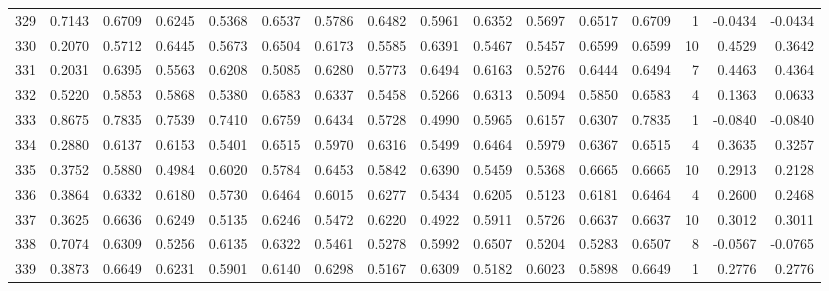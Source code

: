 \begin{tabular}{lrrrrrrrrrrrrrrr}
329 &      0.7143 &  0.6709 &  0.6245 &  0.5368 &  0.6537 &  0.5786 &  0.6482 &  0.5961 &  0.6352 &  0.5697 &   0.6517 &     0.6709 &      1 &                   -0.0434 &                    -0.0434 \\
330 &      0.2070 &  0.5712 &  0.6445 &  0.5673 &  0.6504 &  0.6173 &  0.5585 &  0.6391 &  0.5467 &  0.5457 &   0.6599 &     0.6599 &     10 &                    0.4529 &                     0.3642 \\
331 &      0.2031 &  0.6395 &  0.5563 &  0.6208 &  0.5085 &  0.6280 &  0.5773 &  0.6494 &  0.6163 &  0.5276 &   0.6444 &     0.6494 &      7 &                    0.4463 &                     0.4364 \\
332 &      0.5220 &  0.5853 &  0.5868 &  0.5380 &  0.6583 &  0.6337 &  0.5458 &  0.5266 &  0.6313 &  0.5094 &   0.5850 &     0.6583 &      4 &                    0.1363 &                     0.0633 \\
333 &      0.8675 &  0.7835 &  0.7539 &  0.7410 &  0.6759 &  0.6434 &  0.5728 &  0.4990 &  0.5965 &  0.6157 &   0.6307 &     0.7835 &      1 &                   -0.0840 &                    -0.0840 \\
334 &      0.2880 &  0.6137 &  0.6153 &  0.5401 &  0.6515 &  0.5970 &  0.6316 &  0.5499 &  0.6464 &  0.5979 &   0.6367 &     0.6515 &      4 &                    0.3635 &                     0.3257 \\
335 &      0.3752 &  0.5880 &  0.4984 &  0.6020 &  0.5784 &  0.6453 &  0.5842 &  0.6390 &  0.5459 &  0.5368 &   0.6665 &     0.6665 &     10 &                    0.2913 &                     0.2128 \\
336 &      0.3864 &  0.6332 &  0.6180 &  0.5730 &  0.6464 &  0.6015 &  0.6277 &  0.5434 &  0.6205 &  0.5123 &   0.6181 &     0.6464 &      4 &                    0.2600 &                     0.2468 \\
337 &      0.3625 &  0.6636 &  0.6249 &  0.5135 &  0.6246 &  0.5472 &  0.6220 &  0.4922 &  0.5911 &  0.5726 &   0.6637 &     0.6637 &     10 &                    0.3012 &                     0.3011 \\
338 &      0.7074 &  0.6309 &  0.5256 &  0.6135 &  0.6322 &  0.5461 &  0.5278 &  0.5992 &  0.6507 &  0.5204 &   0.5283 &     0.6507 &      8 &                   -0.0567 &                    -0.0765 \\
339 &      0.3873 &  0.6649 &  0.6231 &  0.5901 &  0.6140 &  0.6298 &  0.5167 &  0.6309 &  0.5182 &  0.6023 &   0.5898 &     0.6649 &      1 &                    0.2776 &                     0.2776 \\

\end{tabular}
